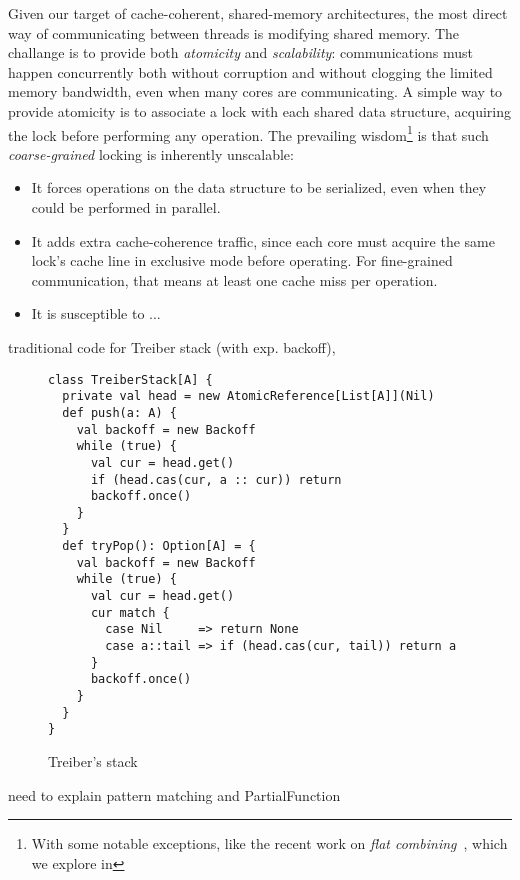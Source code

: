 \documentclass[preprint]{sigplanconf}
\begin{document}
Given our target of cache-coherent, shared-memory architectures, the
most direct way of communicating between threads is modifying shared
memory.  The challange is to provide both \emph{atomicity} and
\emph{scalability}: communications must happen concurrently both
without corruption and without clogging the limited memory bandwidth,
even when many cores are communicating.  A simple way to provide
atomicity is to associate a lock with each shared data structure,
acquiring the lock before performing any operation.  The prevailing
wisdom\footnote{With some notable exceptions, like the recent work on
  \emph{flat combining}~\cite{?}, which we explore in } is
that such \emph{coarse-grained} locking is inherently unscalable:
\begin{itemize}
\item It forces operations on the data structure to be serialized,
  even when they could be performed in parallel.
\item It adds extra cache-coherence traffic, since each core must
  acquire the same lock's cache line in exclusive mode before
  operating.  For fine-grained communication, that means at least one
  cache miss per operation.
\item It is susceptible to ... %
\end{itemize}




traditional code for Treiber stack (with exp. backoff), 

\begin{figure}
\begin{lstlisting}
class TreiberStack[A] {
  private val head = new AtomicReference[List[A]](Nil)
  def push(a: A) {
    val backoff = new Backoff
    while (true) {
      val cur = head.get()
      if (head.cas(cur, a :: cur)) return
      backoff.once()
    }
  }
  def tryPop(): Option[A] = {
    val backoff = new Backoff
    while (true) {
      val cur = head.get() 
      cur match {
        case Nil     => return None
        case a::tail => if (head.cas(cur, tail)) return a
      }
      backoff.once()
    }
  }
}
\end{lstlisting}
\caption{Treiber's stack}
\end{figure}

need to explain pattern matching and PartialFunction
\end{document}
